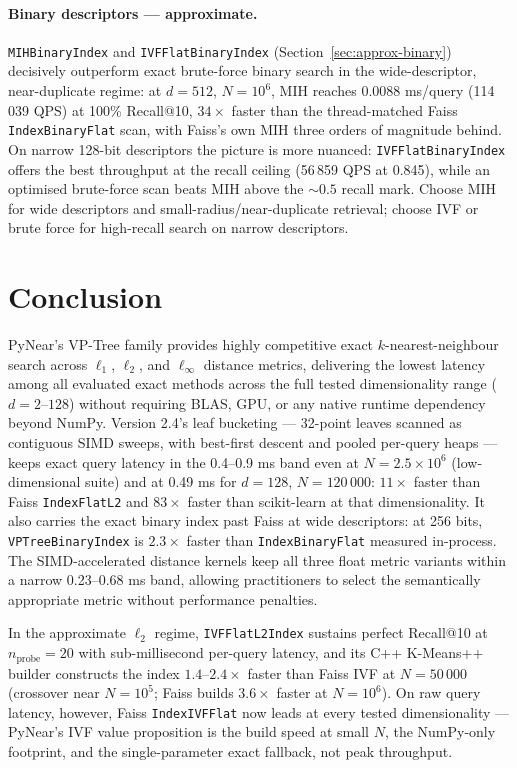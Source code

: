 \documentclass[11pt,a4paper]{article}
\begin{document}
\paragraph{Binary descriptors — approximate.}
\texttt{MIHBinaryIndex} and \texttt{IVFFlatBinaryIndex}
(Section~\ref{sec:approx-binary}) decisively outperform exact brute-force
binary search in the wide-descriptor, near-duplicate regime: at $d=512$,
$N=10^6$, MIH reaches 0.0088 ms/query (114\,039 QPS) at 100\% Recall@10,
$34\times$ faster than the thread-matched Faiss \texttt{IndexBinaryFlat}
scan, with Faiss's own MIH three orders of magnitude behind.  On narrow
128-bit descriptors the picture is more nuanced: \texttt{IVFFlatBinaryIndex}
offers the best throughput at the recall ceiling (56\,859 QPS at 0.845),
while an optimised brute-force scan beats MIH above the ${\sim}0.5$ recall
mark.  Choose MIH for wide descriptors and small-radius/near-duplicate
retrieval; choose IVF or brute force for high-recall search on narrow
descriptors.

\section{Conclusion}
\label{sec:conclusion}

PyNear's VP-Tree family provides highly competitive exact $k$-nearest-neighbour
search across $\ell_1$, $\ell_2$, and $\ell_\infty$ distance metrics,
delivering the lowest latency among all evaluated exact methods across the
full tested dimensionality range ($d = 2\text{--}128$) without requiring BLAS,
GPU, or any native runtime dependency beyond NumPy.
Version 2.4's leaf bucketing — 32-point leaves scanned as contiguous SIMD
sweeps, with best-first descent and pooled per-query heaps — keeps exact
query latency in the 0.4--0.9 ms band even at $N = 2.5\times10^6$
(low-dimensional suite) and at 0.49 ms for $d=128$, $N=120\,000$:
$11\times$ faster than Faiss \texttt{IndexFlatL2} and $83\times$ faster
than scikit-learn at that dimensionality.  It also carries the exact binary
index past Faiss at wide descriptors: at 256 bits,
\texttt{VPTreeBinaryIndex} is $2.3\times$ faster than
\texttt{IndexBinaryFlat} measured in-process.  The SIMD-accelerated
distance kernels keep all three float metric variants within a narrow
0.23--0.68 ms band, allowing practitioners to
select the semantically appropriate metric without performance penalties.

In the approximate $\ell_2$ regime, \texttt{IVFFlatL2Index} sustains
perfect Recall@10 at $n_{\mathrm{probe}}=20$ with sub-millisecond per-query
latency, and its C++ K-Means++ builder constructs the index
$1.4\text{--}2.4\times$ faster than Faiss IVF at $N=50\,000$ (crossover
near $N=10^5$; Faiss builds $3.6\times$ faster at $N=10^6$).  On raw query
latency, however, Faiss \texttt{IndexIVFFlat} now leads at every tested
dimensionality — PyNear's IVF value proposition is the build speed at small
$N$, the NumPy-only footprint, and the single-parameter exact fallback,
not peak throughput.
\end{document}
